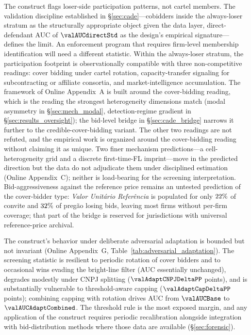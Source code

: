 The construct flags loser-side participation patterns, not cartel
members. The validation discipline established in
\S\ref{sec:cade}---cobidders inside the always-loser stratum as
the structurally appropriate object given the data layer,
direct-defendant AUC of $\valAUCdirectStd$ as the design's
empirical signature---defines the limit. An enforcement program
that requires firm-level membership identification will need a
different statistic. Within the always-loser stratum, the
participation footprint is observationally compatible with three
non-competitive readings: cover bidding under cartel rotation,
capacity-transfer signaling for subcontracting or affiliate
consortia, and market-intelligence accumulation. The framework of
Online Appendix~A is built around the cover-bidding reading,
which is the reading the strongest heterogeneity dimensions
match (modal asymmetry in \S\ref{sec:mech_modal}, detection-regime
gradient in \S\ref{sec:results_oversight}); the bid-level bridge
in \S\ref{sec:cade_bridge} narrows it further to the
credible-cover-bidding variant. The other two readings are not
refuted, and the empirical work is organized around the
cover-bidding reading without claiming it as unique. Two finer
mechanism predictions---a cell-heterogeneity grid and a discrete
first-time-FL imprint---move in the predicted direction but the
data do not adjudicate them under disciplined estimation
(Online Appendix~C); neither is load-bearing for the screening
interpretation. Bid-aggressiveness against the reference price
remains an untested prediction of the cover-bidder type:
\textit{Valor Unit\'ario Refer\^encia} is populated for only
$22\%$ of convite and $32\%$ of
preg\~ao losing bids, leaving most firms without per-firm
coverage; that part of the bridge is reserved for jurisdictions
with universal reference-price archival.

The construct's behavior under deliberate adversarial adaptation
is bounded but not invariant
(Online Appendix~G,
Table~\ref{tab:adversarial_adaptation}). The screening statistic
is resilient to periodic rotation of cover bidders and to
occasional wins evading the bright-line filter (AUC essentially
unchanged), degrades modestly under CNPJ splitting
($\valAdaptCNPJDeltaPP$ points), and is substantially vulnerable
to threshold-aware capping ($\valAdaptCapDeltaPP$ points);
combining capping with rotation drives AUC from $\valAUCBase$ to
$\valAUCAdaptCombined$. The threshold rule is the most exposed
margin, and any application of the construct requires periodic
recalibration alongside integration with bid-distribution methods
where those data are available (\S\ref{sec:forensic}).

